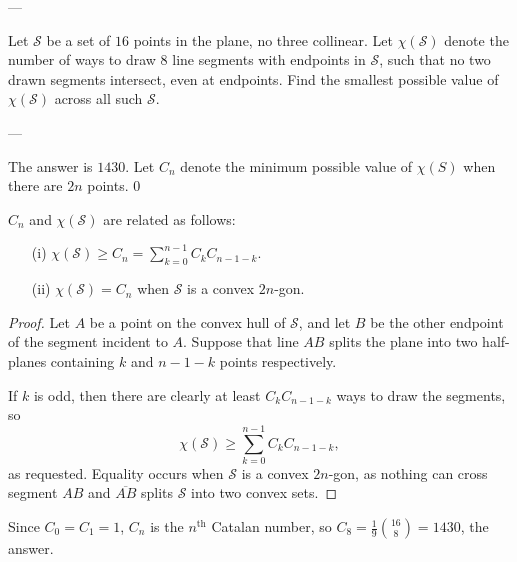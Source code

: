 
---

Let $\mathcal S$ be a set of $16$ points in the plane, no three collinear. Let $\chi(\mathcal S)$ denote the number of ways to draw $8$ line segments with endpoints in $\mathcal S$, such that no two drawn segments intersect, even at endpoints. Find the smallest possible value of $\chi(\mathcal S)$ across all such $\mathcal S$.

---

The answer is $1430$. Let $C_n$ denote the minimum possible value of $\chi(S)$ when there are $2n$ points.
\setcounter{iclaim}0
\begin{boxclaim}
    $C_n$ and $\chi(\mathcal S)$ are related as follows:
    \begin{itemize}
        \item[(i)] $\chi(\mathcal S)\ge C_n=\sum_{k=0}^{n-1}C_kC_{n-1-k}$.
        \item[(ii)] $\chi(\mathcal S)=C_n$ when $\mathcal S$ is a convex $2n$-gon.
    \end{itemize}
\end{boxclaim}
\begin{proof}
    Let $A$ be a point on the convex hull of $\mathcal S$, and let $B$ be the other endpoint of the segment incident to $A$. Suppose that line $AB$ splits the plane into two half-planes containing $k$ and $n-1-k$ points respectively.

    If $k$ is odd, then there are clearly at least $C_kC_{n-1-k}$ ways to draw the segments, so $$\chi(\mathcal S)\ge\sum_{k=0}^{n-1}C_kC_{n-1-k},$$
    as requested. Equality occurs when $\mathcal S$ is a convex $2n$-gon, as nothing can cross segment $AB$ and $\overline{AB}$ splits $\mathcal S$ into two convex sets.
\end{proof}

Since $C_0=C_1=1$, $C_n$ is the $n^\text{th}$ Catalan number, so $C_8=\tfrac19\binom{16}8=1430$, the answer.
